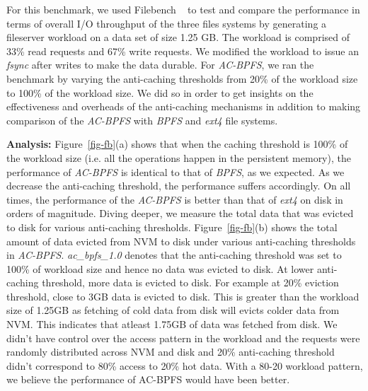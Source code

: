 For this benchmark, we used Filebench ~\cite{filebench} to test and compare the performance in terms of overall I/O throughput of the three files systems by generating a fileserver workload on a data set of size 1.25 GB. The workload is comprised of 33\% read requests and 67\% write requests. We modified the workload to issue an \textit{fsync} after writes to make the data durable. For \textit{AC-BPFS}, we ran the benchmark by varying the anti-caching thresholds from 20\% of the workload size to 100\% of the workload size. We did so in order to get insights on the effectiveness and overheads of the anti-caching mechanisms in addition to making comparison of the \textit{AC-BPFS} with \textit{BPFS} and \textit{ext4} file systems.

\textbf{Analysis:} Figure~\ref{fig-fb}(a) shows that when the caching threshold is 100\% of the workload size (i.e. all the operations happen in the persistent memory), the performance of \textit{AC-BPFS} is identical to that of \textit{BPFS}, as we expected. As we decrease the anti-caching threshold, the performance suffers accordingly. On all times, the performance of the \textit{AC-BPFS} is better than that of \textit{ext4} on disk in orders of magnitude. Diving deeper, we measure the total data that was evicted to disk for various anti-caching thresholds. Figure~\ref{fig-fb}(b) shows the total amount of data evicted from NVM to disk under various anti-caching thresholds in \textit{AC-BPFS}. \textit{ac\_bpfs\_1.0} denotes that the anti-caching threshold was set to 100\% of workload size and hence no data was evicted to disk. At lower anti-caching threshold, more data is evicted to disk. For example at 20\% eviction threshold, close to 3GB data is evicted to disk. This is greater than the workload size of 1.25GB as fetching of cold data from disk will evicts colder data from NVM. This indicates that atleast 1.75GB of data was fetched from disk. We didn't have control over the access pattern in the workload and the requests were randomly distributed across NVM and disk and 20\% anti-caching threshold didn't correspond to 80\% access to 20\% hot data. With a 80-20 workload pattern, we believe the performance of AC-BPFS would have been better.